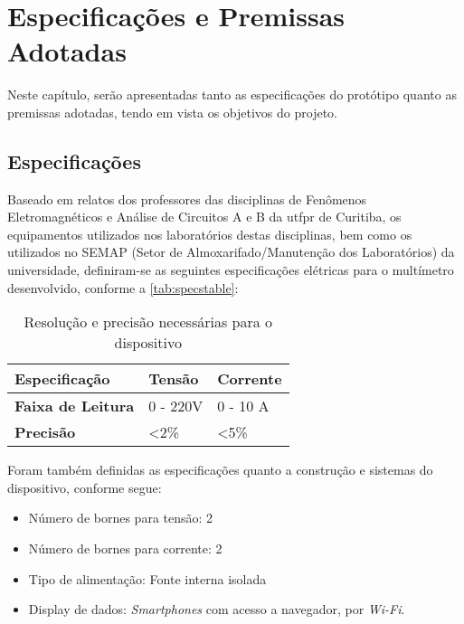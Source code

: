 \chapter{Especificações e Premissas Adotadas}\label{cap:especificacoes}

Neste capítulo, serão apresentadas tanto as especificações do protótipo quanto as premissas adotadas, tendo em vista os objetivos do projeto.

\section{Especificações}\label{spec}
Baseado em relatos dos professores das disciplinas de Fenômenos Eletromagnéticos e Análise de Circuitos A e B da \gls{utfpr} de Curitiba, os equipamentos utilizados nos laboratórios destas disciplinas, bem como os utilizados no \gls{SEMAP} (Setor de Almoxarifado/Manutenção dos Laboratórios) da universidade, definiram-se as seguintes especificações elétricas para o multímetro desenvolvido, conforme a \autoref{tab:specstable}:

\begin{table}[!ht]
    \centering
    \caption{Resolução e precisão necessárias para o dispositivo}
    \vspace*{5mm}
    \label{tab:specstable}
    \begin{tabular}{ l l l }
        \hline
        \textbf{Especificação}    & \textbf{Tensão} & \textbf{Corrente} \\ \hline
        \textbf{Faixa de Leitura} & 0 - 220V        & 0 - 10 A          \\ 
        \textbf{Precisão}         & <2\%            & <5\%              \\ \hline
    \end{tabular}
    \fonte{}
\end{table}

Foram também definidas as especificações quanto a construção e sistemas do dispositivo, conforme segue:

\begin{itemize}
    \item Número de bornes para tensão: 2
    \item Número de bornes para corrente: 2
    \item Tipo de alimentação: Fonte interna isolada
    \item Display de dados: \textit{Smartphones} com acesso a navegador, por \textit{Wi-Fi}.
\end{itemize}

